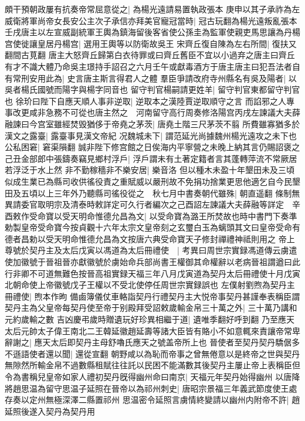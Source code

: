 頗干預朝政屢有抗奏帝常屈意從之|{
	為楊光遠請易置執政張本}
庚申以其子承祚為左威衛將軍尚帝女長安公主次子承信亦拜美官寵冠當時|{
	冠古玩翻為楊光遠叛亂張本}
壬戌唐主以左宣威副統軍王輿為鎮海留後客省使公孫圭為監軍使親吏馬思讓為丹楊宫使徙讓皇居丹楊宫|{
	選用王輿等以防衛故吳王}
宋齊丘復自陳為左右所間|{
	復扶又翻間古莧翻}
唐主大怒齊丘歸第白衣待罪或曰齊丘舊臣不宜以小過弃之唐主曰齊丘有才不識大體乃命吳主璟持手詔召之六月壬午或獻毒酒方于唐主唐主曰犯吾法者自有常刑安用此為|{
	史言唐主斯言得君人之體}
羣臣爭請改府寺州縣名有吳及陽者|{
	以吳者楊氏國號而陽字與楊字同音也}
留守判官楊嗣請更姓羊|{
	留守判官東都留守判官也}
徐玠曰陛下自應天順人事非逆取|{
	逆取本之漢陸賈逆取順守之言}
而諂邪之人專事改更咸非急務不可從也唐主然之　河南留守高行周奏修洛陽宫丙戌左諫議大夫薛融諫曰今宫室雖經焚毁猶侈于帝堯之茅茨|{
	唐堯土階三尺茅茨不翦}
所費雖寡猶多於漢文之露臺|{
	露臺事見漢文帝紀}
况魏城未下|{
	謂范延光尚據魏州楊光遠攻之未下也}
公私困窘|{
	窘渠隕翻}
誠非陛下修宫館之日俟海内平寧營之未晚上納其言仍賜詔褒之　己丑金部郎中張鑄奏竊見鄉村浮戶|{
	浮戶謂未有土著定籍者言其蓬轉萍流不常厥居若浮泛于水上然}
非不勤稼穡非不樂安居|{
	樂音洛}
但以種木未盈十年墾田未及三頃似成生業已為縣司收供徭役責之重賦威以嚴刑故不免捐功捨業更思他適乞自今民墾田及五頃以上三年外乃聽縣司徭役從之　秋七月中書奏朝代雖殊|{
	朝直遥翻}
條制無異請委官取明宗及清泰時敕詳定可久行者編次之己酉詔左諫議大夫薛融等詳定　辛酉敕作受命寶以受天明命惟德允昌為文|{
	以受命寶為潞王所焚故也時中書門下奏準勅製皇帝受命寶今按貞觀十六年太宗文皇帝刻之玄璽白玉為螭頭其文曰皇帝受命有德者昌勅以受天明命惟德允昌為文按唐六典受命寶天子修封禪禮神祗則用之}
帝上尊號於契丹主及太后戊寅以馮道為太后冊禮使　|{
	考異曰周世宗實録馮道傳云虜遣使加徽號于晉祖晉亦獻徽號於虜始命兵部尚書王權御其命權辭以老病晉祖謂遒曰此行非卿不可道無難色按晉高祖實録天福三年八月戊寅道為契丹太后冊禮使十月戊寅北朝命使上帝徽號戊子王權以不受北使停任周世宗實録誤也}
左僕射劉煦為契丹主冊禮使|{
	煦本作昫}
備鹵簿儀仗車輅詣契丹行禮契丹主大悦帝事契丹甚謹奉表稱臣謂契丹主為父皇帝每契丹使至帝于别殿拜受詔敕歲輸金帛三十萬之外|{
	三十萬乃講和元約歲輸之數}
吉凶慶弔歲時贈遺玩好珍異相繼于道|{
	遺唯季翻好呼到翻}
乃至應天太后元帥太子偉王南北二王韓延徽趙延壽等諸大臣皆有賂小不如意輒來責讓帝常卑辭謝之|{
	應天太后即契丹主母舒嚕氏應天之號盖帝所上也}
晉使者至契丹契丹驕倨多不遜語使者還以聞|{
	還從宣翻}
朝野咸以為恥而帝事之曾無倦意以是終帝之世與契丹無隙然所輸金帛不過數縣租賦往往託以民困不能滿數其後契丹主屢止帝上表稱臣但令為書稱兒皇帝如家人禮初契丹旣得幽州命曰南京|{
	天福元年契丹始得幽州}
以唐降將趙思温為留守思温子延照在晉帝以為祁州刺史|{
	唐昭宗景福三年義武節度使王處存奏以定州無極深澤二縣置祁州}
思温密令延照言虜情終變請以幽州内附帝不許|{
	趙延照後遂入契丹為契丹用}

